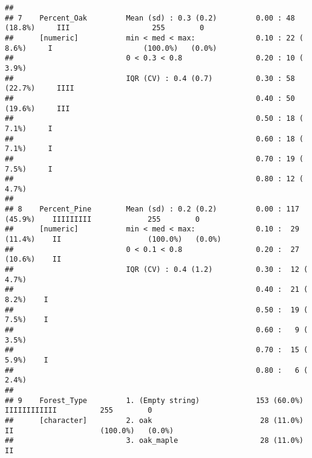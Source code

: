 \documentclass[
]{article}
\begin{document}
\begin{verbatim}
## 
## 7    Percent_Oak         Mean (sd) : 0.3 (0.2)         0.00 : 48 (18.8%)     III                   255        0         
##      [numeric]           min < med < max:              0.10 : 22 ( 8.6%)     I                     (100.0%)   (0.0%)    
##                          0 < 0.3 < 0.8                 0.20 : 10 ( 3.9%)                                                
##                          IQR (CV) : 0.4 (0.7)          0.30 : 58 (22.7%)     IIII                                       
##                                                        0.40 : 50 (19.6%)     III                                        
##                                                        0.50 : 18 ( 7.1%)     I                                          
##                                                        0.60 : 18 ( 7.1%)     I                                          
##                                                        0.70 : 19 ( 7.5%)     I                                          
##                                                        0.80 : 12 ( 4.7%)                                                
## 
## 8    Percent_Pine        Mean (sd) : 0.2 (0.2)         0.00 : 117 (45.9%)    IIIIIIIII             255        0         
##      [numeric]           min < med < max:              0.10 :  29 (11.4%)    II                    (100.0%)   (0.0%)    
##                          0 < 0.1 < 0.8                 0.20 :  27 (10.6%)    II                                         
##                          IQR (CV) : 0.4 (1.2)          0.30 :  12 ( 4.7%)                                               
##                                                        0.40 :  21 ( 8.2%)    I                                          
##                                                        0.50 :  19 ( 7.5%)    I                                          
##                                                        0.60 :   9 ( 3.5%)                                               
##                                                        0.70 :  15 ( 5.9%)    I                                          
##                                                        0.80 :   6 ( 2.4%)                                               
## 
## 9    Forest_Type         1. (Empty string)             153 (60.0%)           IIIIIIIIIIII          255        0         
##      [character]         2. oak                         28 (11.0%)           II                    (100.0%)   (0.0%)    
##                          3. oak_maple                   28 (11.0%)           II                                         

\end{verbatim}
\end{document}
